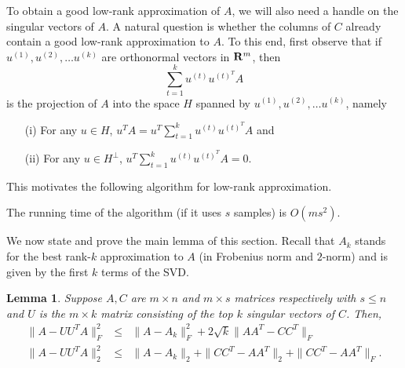 \documentclass{book}
\newtheorem{lemma}[theorem]{Lemma}
\numberwithin{exercise}{chapter}
\begin{document}
To obtain a good low-rank approximation of $A$, we will also need a handle on the singular vectors of $A$. A natural question is whether the columns of $C$ already contain a good low-rank approximation to $A$.
To this end, first observe that if $u^{(1)},u^{(2)},\ldots
u^{(k)}$ are orthonormal vectors in ${\bf R}^m$, then
$$\sum_{t=1}^ku^{(t)}u^{(t)^T}A$$
is the projection of $A$ into the space $H$ spanned by $u^{(1)},u^{(2)},\ldots
u^{(k)}$, namely
\begin{enumerate}
\item[(i)] For any $u\in H$, $u^TA=u^T\sum_{t=1}^ku^{(t)}u^{(t)^T}A$ and

\item[(ii)] For any $u\in H^\perp$, $u^T\sum_{t=1}^ku^{(t)}u^{(t)^T}A=0$.
\end{enumerate}
This motivates the following algorithm for low-rank approximation.

\begin{center}
\end{center}

The running time of the algorithm (if it uses $s$ samples) is $O(ms^2)$.

We now state and prove the main lemma of this section. Recall that $A_k$ stands for the best rank-$k$ approximation to $A$ (in Frobenius norm and $2$-norm) and is given by the first $k$ terms of the SVD.

\begin{lemma}\label{svdC}
Suppose $A,C$ are $m\times n$ and $m\times s$ matrices respectively with $s\leq n$ and $U$ is the  $m\times k$ matrix consisting of the top $k$ singular vectors of $C$. Then,
\begin{eqnarray*}
\|A-UU^TA\|_F^2&\leq& \|A-A_k\|_F^2+2\sqrt{k}\|AA^T-CC^T\|_F\\
\|A-UU^TA\|_2^2&\leq& \|A-A_k\|_2+\|CC^T-AA^T\|_2+\|CC^T-AA^T\|_F.
\end{eqnarray*}
\end{lemma}
\end{document}

